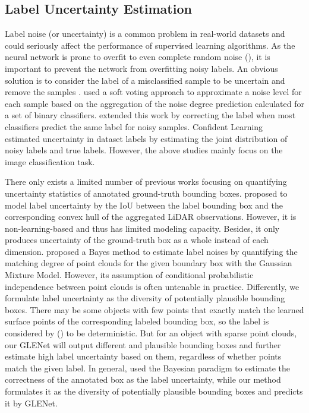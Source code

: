 \documentclass[twocolumn]{svjour3}
\begin{document}
\subsection{Label Uncertainty Estimation}
Label noise (or uncertainty) is a common problem in real-world datasets and could seriously affect the performance of supervised learning algorithms. 
As the neural network is prone to overfit to even complete random noise (\cite{zhang2021understanding}), it is important to prevent the network from overfitting noisy labels.
An obvious solution is to consider the label of a misclassified sample to be uncertain and remove the samples \citep{delany2012profiling}.
\cite{garcia2015using} used a soft voting approach to approximate a noise level for each sample based on the aggregation of the noise degree prediction calculated for a set of binary classifiers. \cite{luengo2018cnc} extended this work by correcting the label when most classifiers predict the same label for noisy samples.
Confident Learning~\cite{northcutt2021confident} estimated uncertainty in dataset labels by estimating the joint distribution of noisy labels and true labels.
However, the above studies mainly focus on the image classification task.

There only exists a limited number of previous works focusing on quantifying uncertainty statistics of annotated ground-truth bounding boxes. \cite{meyer2020learning} proposed to model label uncertainty by the IoU between the label bounding box and the corresponding convex hull of the aggregated LiDAR observations. 
However, it is non-learning-based and thus has limited modeling capacity. Besides, it only produces uncertainty of the ground-truth box as a whole instead of each dimension.
\cite{feng_iros} proposed a Bayes method to estimate label noises by quantifying the matching degree of point clouds for the given boundary box with the Gaussian Mixture Model. However, its assumption of conditional probabilistic independence between point clouds is often untenable in practice. Differently, we formulate label uncertainty as the diversity of potentially plausible bounding boxes. There may be some objects with few points that exactly match the learned surface points of the corresponding labeled bounding box, so the label is considered by (\cite{feng_iros}) to be deterministic. But for an object with sparse point clouds, our GLENet will output different and plausible bounding boxes and further estimate high label uncertainty based on them, regardless of whether points match the given label. In general, \cite{feng_iros} used the Bayesian paradigm to estimate the correctness of the annotated box as the label uncertainty, while our method formulates it as the diversity of potentially plausible bounding boxes and predicts it by GLENet.
\end{document}
